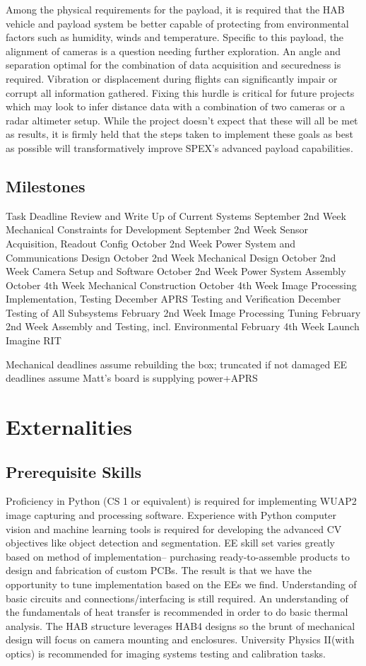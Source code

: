 \documentclass[conference]{IEEEtran} %
\begin{document}
Among the physical requirements for the payload, it is required that the HAB vehicle and payload system be better capable of protecting from environmental factors such as humidity, winds and temperature. Specific to this payload, the alignment of cameras is a question needing further exploration. An angle and separation optimal for the combination of data acquisition and securedness is required. Vibration or displacement during flights can significantly impair or corrupt all information gathered. Fixing this hurdle is critical for future projects which may look to infer distance data with a combination of two cameras or a radar altimeter setup. While the project doesn’t expect that these will all be met as results, it is firmly held that the steps taken to implement these goals as best as possible will transformatively improve SPEX’s advanced payload capabilities.

\subsection{Milestones}

Task
Deadline
Review and Write Up of Current Systems
September 2nd Week
Mechanical Constraints for Development
September 2nd Week
Sensor Acquisition, Readout Config
October 2nd Week
Power System and Communications Design
October 2nd Week
Mechanical Design
October 2nd Week
Camera Setup and Software
October 2nd Week
Power System Assembly
October 4th Week
Mechanical Construction
October 4th Week
Image Processing Implementation, Testing
December
APRS Testing and Verification
December
Testing of All Subsystems
February 2nd Week
Image Processing Tuning
February 2nd Week
Assembly and Testing, incl. Environmental
February 4th Week
Launch
Imagine RIT


Mechanical deadlines assume rebuilding the box; truncated if not damaged
EE deadlines assume Matt’s board is supplying power+APRS

\section{Externalities}
\subsection{Prerequisite Skills}
Proficiency in Python (CS 1 or equivalent) is required for implementing WUAP2 image capturing and processing software.  Experience with Python computer vision and machine learning tools is required for developing the advanced CV objectives like object detection and segmentation. EE skill set varies greatly based on method of implementation-- purchasing ready-to-assemble products to design and fabrication of custom PCBs. The result is that we have the opportunity to tune implementation based on the EEs we find. Understanding of basic circuits and connections/interfacing is still required. An understanding of the fundamentals of heat transfer is recommended in order to do basic thermal analysis. The HAB structure leverages HAB4 designs so the brunt of mechanical design will focus on camera mounting and enclosures. University Physics II(with optics) is recommended for imaging systems testing and calibration tasks.
\end{document}
